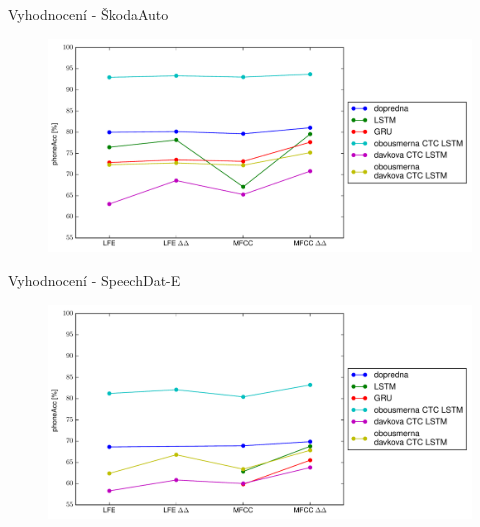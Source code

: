 \documentclass[10pt]{beamer}
\begin{document}
\begin{frame}{Vyhodnocení - ŠkodaAuto}
	\begin{figure}
		\includegraphics[width=1.0\linewidth]{skoda_results.pdf}
	\end{figure}
\end{frame}

\begin{frame}{Vyhodnocení - SpeechDat-E}
	\begin{figure}
		\includegraphics[width=1.0\linewidth]{speechdat_results.pdf}
	\end{figure}
\end{frame}
\end{document}

